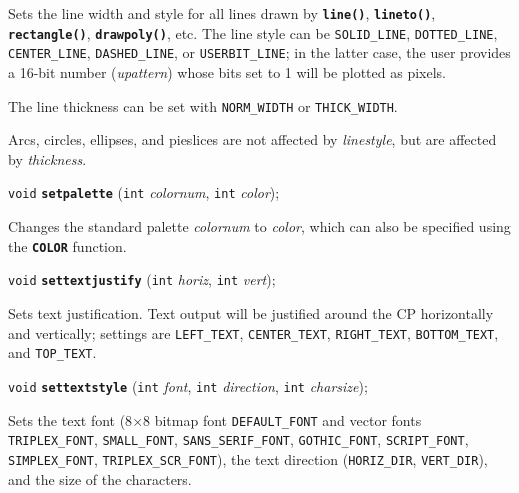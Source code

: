 \documentclass[a4paper,12pt]{article}
\newcommand{\V}{\texttt{void}}      %
\newcommand{\I}{\texttt{int}}       %
\newcommand{\func}[1]{\textbf{\texttt{#1}}}  %
\newcommand{\A}[1]{\emph{#1}}       %
\newcommand{\T}[1]{\texttt{#1}}     %
\newenvironment{bgi}
{ %
  \begin{snugshade}
}
{ %
  \end{snugshade}
}
\begin{document}
Sets the line width and style for all lines drawn by \func{line()},
\func{lineto()}, \func{rectangle()}, \func{drawpoly()}, etc. The line
style can be \T{SOLID\_LINE}, \T{DOTTED\_LINE}, \T{CENTER\_LINE},
\T{DASHED\-\_LINE}, or \T{USERBIT\_LINE}; in the latter case, the user
provides a 16-bit number (\A{upattern}) whose bits set to 1 will be
plotted as pixels.

The line thickness can be set with \T{NORM\_WIDTH} or
\T{THICK\-\_WIDTH}.

Arcs, circles, ellipses, and pieslices are not affected by
\A{linestyle}, but are affected by \A{thickness}.


\label{sec:setpalette}

\begin{bgi}
\V{} \func{setpalette} (\I{} \A{colornum}, \I{} \A{color});
\end{bgi}

Changes the standard palette \A{colornum} to \A{color}, which can also
be specified using the \func{COLOR} function.


\label{sec:settextjustify}

\begin{bgi}
\V{} \func{settextjustify} (\I{} \A{horiz}, \I{} \A{vert});
\end{bgi}

Sets text justification. Text output will be justified around the CP
horizontally and vertically; settings are \T{LEFT\_TEXT},
\T{CENTER\_TEXT}, \T{RIGHT\-\_TEXT}, \T{BOTTOM\_TEXT}, and
\T{TOP\_TEXT}.


\label{sec:settextstyle}

\begin{bgi}
\V{} \func{settextstyle} (\I{} \A{font}, \I{} \A{direction}, \I{}
\A{charsize});
\end{bgi}

Sets the text font (8$\times$8 bitmap font \T{DEFAULT\_FONT} and
vector fonts \T{TRIPLEX\_FONT}, \T{SMALL\-\_FONT},
\T{SANS\_SERIF\_FONT}, \T{GOTHIC\_FONT}, \T{SCRIPT\_FONT},
\T{SIMPLEX\_FONT}, \T{TRIPLEX\_SCR\_FONT}), the text direction
(\T{HORIZ\_DIR}, \T{VERT\_DIR}), and the size of the characters.
\end{document}
